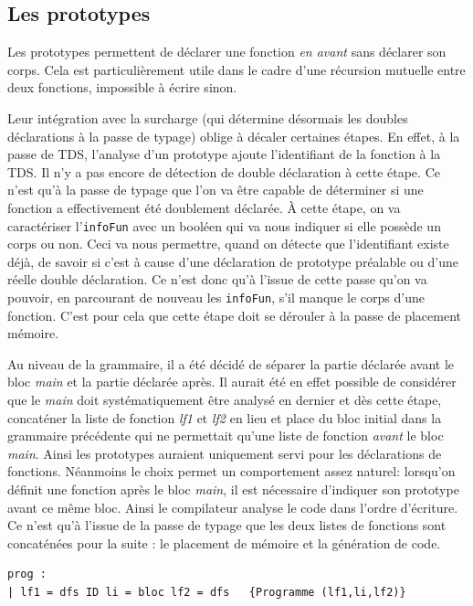 \documentclass[11pt,a4paper]{article}
\begin{document}
\subsection{Les prototypes}

Les prototypes permettent de déclarer une fonction \emph{en avant} sans déclarer son corps. Cela est particulièrement utile dans le cadre d'une récursion mutuelle entre deux fonctions, impossible à écrire sinon.

Leur intégration avec la surcharge (qui détermine désormais les doubles déclarations à la passe de typage) oblige à décaler certaines étapes. En effet, à la passe de TDS, l'analyse d'un prototype ajoute l'identifiant de la fonction à la TDS. Il n'y a pas encore de détection de double déclaration à cette étape. Ce n'est qu'à la passe de typage que l'on va être capable de déterminer si une fonction a effectivement été doublement déclarée. À cette étape, on va caractériser l'\texttt{infoFun} avec un booléen qui va nous indiquer si elle possède un corps ou non. Ceci va nous permettre, quand on détecte que l'identifiant existe déjà, de savoir si c'est à cause d'une déclaration de prototype préalable ou d'une réelle double déclaration. Ce n'est donc qu'à l'issue de cette passe qu'on va pouvoir, en parcourant de nouveau les \texttt{infoFun}, s'il manque le corps d'une fonction. C'est pour cela que cette étape doit se dérouler à la passe de placement mémoire.

Au niveau de la grammaire, il a été décidé de séparer la partie déclarée avant le bloc \emph{main} et la partie déclarée après. Il aurait été en effet possible de considérer que le \emph{main} doit systématiquement être analysé en dernier et dès cette étape, concaténer la liste de fonction \emph{lf1} et \emph{lf2} en lieu et place du bloc initial dans la grammaire précédente qui ne permettait qu'une liste de fonction \emph{avant} le bloc \emph{main}. Ainsi les prototypes auraient uniquement servi pour les déclarations de fonctions. Néanmoins le choix permet un comportement assez naturel: lorsqu'on définit une fonction après le bloc \emph{main}, il est nécessaire d'indiquer son prototype avant ce même bloc. Ainsi le compilateur analyse le code dans l'ordre d'écriture. Ce n'est qu'à l'issue de la passe de typage que les deux listes de fonctions sont concaténées pour la suite : le placement de mémoire et la génération de code.

\begin{verbatim}
prog :
| lf1 = dfs ID li = bloc lf2 = dfs   {Programme (lf1,li,lf2)}
\end{verbatim}
\end{document}
